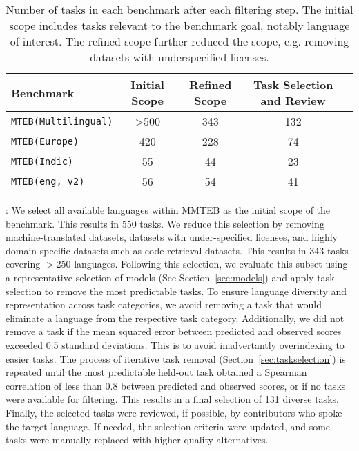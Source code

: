 \begin{table}
\centering
{\footnotesize
    \begin{tabular}{lcccc}
\toprule
\textbf{Benchmark} & \textbf{Initial Scope}  & \textbf{Refined Scope} & \textbf{Task Selection and Review} \\
\midrule
\texttt{MTEB(Multilingual)} & >500 & 343 & 132 \\
\texttt{MTEB(Europe)} & 420 & 228 & 74 \\
\texttt{MTEB(Indic)} & 55 & 44 & 23 \\
\texttt{MTEB(eng, v2)} & 56 & 54 & 41 \\
\bottomrule
    \end{tabular}
}
    \caption{Number of tasks in each benchmark after each filtering step. The initial scope includes tasks relevant to the benchmark goal, notably language of interest. The refined scope further reduced the scope, e.g. removing datasets with underspecified licenses.}
    \label{tab:numberoftasks}
    \vspace{-3mm}
\end{table}

\noindent
{}:
We select all available languages within MMTEB as the initial scope of the benchmark. This results in 550 tasks. We reduce this selection by removing machine-translated datasets, datasets with under-specified licenses, and highly domain-specific datasets such as code-retrieval datasets. This results in 343 tasks covering $>$250 languages. Following this selection, we evaluate this subset using a representative selection of models (See Section~\ref{sec:models}) and apply task selection to remove the most predictable tasks. To ensure language diversity and representation across task categories, we avoid removing a task that would eliminate a language from the respective task category. Additionally, we did not remove a task if the mean squared error between predicted and observed scores exceeded 0.5 standard deviations. This is to avoid inadvertantly overindexing to easier tasks. The process of iterative task removal (Section~\ref{sec:taskselection}) is repeated until the most predictable held-out task obtained a Spearman correlation of less than 0.8 between predicted and observed scores, or if no tasks were available for filtering. This results in a final selection of 131 diverse tasks. Finally, the selected tasks were reviewed, if possible, by contributors who spoke the target language. If needed, the selection criteria were updated, and some tasks were manually replaced with higher-quality alternatives. 
\newline

